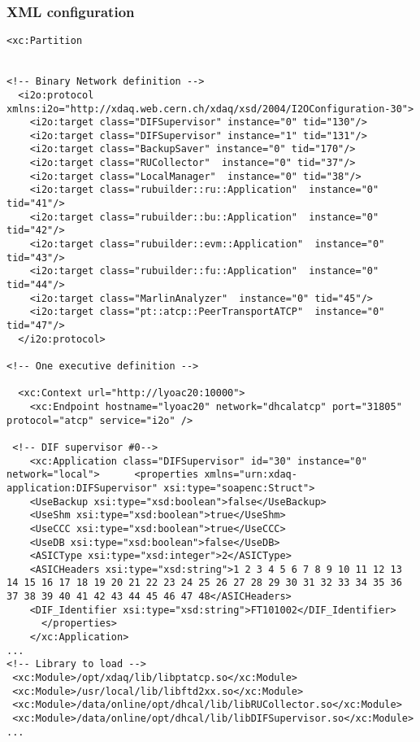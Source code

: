 \documentclass[10pt]{beamer}
\begin{document}
\begin{frame}[fragile,shrink=60]
\frametitle{XML configuration}

\begin{verbatim}
<xc:Partition 
   

<!-- Binary Network definition -->
  <i2o:protocol xmlns:i2o="http://xdaq.web.cern.ch/xdaq/xsd/2004/I2OConfiguration-30">
    <i2o:target class="DIFSupervisor" instance="0" tid="130"/>
    <i2o:target class="DIFSupervisor" instance="1" tid="131"/>
    <i2o:target class="BackupSaver" instance="0" tid="170"/>
    <i2o:target class="RUCollector"  instance="0" tid="37"/>
    <i2o:target class="LocalManager"  instance="0" tid="38"/>
    <i2o:target class="rubuilder::ru::Application"  instance="0" tid="41"/>
    <i2o:target class="rubuilder::bu::Application"  instance="0" tid="42"/>
    <i2o:target class="rubuilder::evm::Application"  instance="0" tid="43"/>
    <i2o:target class="rubuilder::fu::Application"  instance="0" tid="44"/>
    <i2o:target class="MarlinAnalyzer"  instance="0" tid="45"/>
    <i2o:target class="pt::atcp::PeerTransportATCP"  instance="0" tid="47"/>
  </i2o:protocol>

<!-- One executive definition -->

  <xc:Context url="http://lyoac20:10000">
    <xc:Endpoint hostname="lyoac20" network="dhcalatcp" port="31805" protocol="atcp" service="i2o" />

 <!-- DIF supervisor #0-->
    <xc:Application class="DIFSupervisor" id="30" instance="0"  network="local">      <properties xmlns="urn:xdaq-application:DIFSupervisor" xsi:type="soapenc:Struct">
	<UseBackup xsi:type="xsd:boolean">false</UseBackup>
	<UseShm xsi:type="xsd:boolean">true</UseShm>	
	<UseCCC xsi:type="xsd:boolean">true</UseCCC>
	<UseDB xsi:type="xsd:boolean">false</UseDB>	
	<ASICType xsi:type="xsd:integer">2</ASICType>
	<ASICHeaders xsi:type="xsd:string">1 2 3 4 5 6 7 8 9 10 11 12 13 14 15 16 17 18 19 20 21 22 23 24 25 26 27 28 29 30 31 32 33 34 35 36 37 38 39 40 41 42 43 44 45 46 47 48</ASICHeaders>
	<DIF_Identifier xsi:type="xsd:string">FT101002</DIF_Identifier>
      </properties>
    </xc:Application>
...
<!-- Library to load -->
 <xc:Module>/opt/xdaq/lib/libptatcp.so</xc:Module>
 <xc:Module>/usr/local/lib/libftd2xx.so</xc:Module>
 <xc:Module>/data/online/opt/dhcal/lib/libRUCollector.so</xc:Module>
 <xc:Module>/data/online/opt/dhcal/lib/libDIFSupervisor.so</xc:Module>
...
\end{verbatim}

\end{frame}
\end{document}
